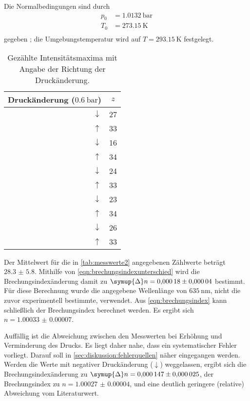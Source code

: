 Die Normalbedingungen sind durch
\begin{align*}
  p_0 &= \SI{1.0132}{\bar} \\
  T_0 &= \SI{273.15}{\kelvin} \\
\end{align*}
gegeben \cite{versuchsanleitung};
die Umgebungstemperatur wird auf $T = \SI{293.15}{\kelvin}$ festgelegt.

\begin{table}[H]
  \centering
  \caption{Gezählte Intensitätsmaxima mit Angabe der Richtung der Druckänderung.}
  \label{tab:messwerte2}
  \def\arraystretch{1.2}
  \begin{tabular}{r c}
  \toprule
  Druckänderung ($\SI{0.6}{\bar}$) &
  $z$ \\
  \midrule
  $\downarrow$ & 27 \\
  $\uparrow$   & 33 \\
  $\downarrow$ & 16 \\
  $\uparrow$   & 34 \\
  $\downarrow$ & 24 \\
  $\uparrow$   & 33 \\
  $\downarrow$ & 23 \\
  $\uparrow$   & 34 \\
  $\downarrow$ & 26 \\
  $\uparrow$   & 33 \\
  \bottomrule
  \end{tabular}
\end{table}

Der Mittelwert für die in \autoref{tab:messwerte2} angegebenen Zählwerte beträgt $\num{28.3(58)}$.
Mithilfe von \autoref{eqn:brechungsindexunterschied} wird die Brechungsindexänderung damit
zu $\symup{\Delta}n = \num{0.00018(4)}$ bestimmt.
Für diese Berechnung wurde die angegebene Wellenlänge von $\SI{635}{\nano\meter}$,
nicht die zuvor experimentell bestimmte,
verwendet.
Aus \autoref{eqn:brechungsindex} kann schließlich der Brechungsindex berechnet werden.
Es ergibt sich $n = \num{1.00033(7)}$.

Auffällig ist die Abweichung zwischen den Messwerten bei Erhöhung und Verminderung des Drucks.
Es liegt daher nahe,
dass ein systematischer Fehler vorliegt.
Darauf soll in \autoref{sec:diskussion:fehlerquellen} näher eingegangen werden.
Werden die Werte mit negativer Druckänderung ($\downarrow$) weggelassen,
ergibt sich
die Brechungsindexänderung zu $\symup{\Delta}n = \num{0.000147(25)}$,
der Brechungsindex zu $n = \num{1.00027(4)}$,
und eine deutlich geringere (relative) Abweichung vom Literaturwert.
